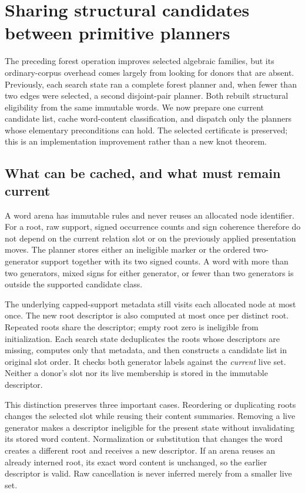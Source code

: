 \section{Sharing structural candidates between primitive planners}
\label{sec:primitive-planner}

The preceding forest operation improves selected algebraic families, but
its ordinary-corpus overhead comes largely from looking for donors that
are absent. Previously, each search state ran a complete forest planner
and, when fewer than two edges were selected, a second disjoint-pair
planner. Both rebuilt structural eligibility from the same immutable
words. We now prepare one current candidate list, cache word-content
classification, and dispatch only the planners whose elementary
preconditions can hold. The selected certificate is preserved; this is
an implementation improvement rather than a new knot theorem.

\subsection{What can be cached, and what must remain current}

A word arena has immutable rules and never reuses an allocated node identifier.
For a root, raw support, signed occurrence counts and sign coherence therefore
do not depend on the current relation slot or on the previously applied
presentation moves. The planner stores either an ineligible marker or the
ordered two-generator support together with its two signed counts. A word
with more than two generators, mixed signs for either generator, or fewer
than two generators is outside the supported candidate class.

The underlying capped-support metadata still visits each allocated node at
most once. The new root descriptor is also computed at most once per distinct
root. Repeated roots share the descriptor; empty root zero is ineligible
from initialization. Each search state deduplicates the roots whose descriptors
are missing, computes only that metadata, and then constructs a candidate
list in original slot order. It checks both generator labels against the
\emph{current} live set. Neither a donor's slot nor its live membership is
stored in the immutable descriptor.

This distinction preserves three important cases. Reordering or duplicating
roots changes the selected slot while reusing their content summaries.
Removing a live generator makes a descriptor ineligible for the present
state without invalidating its stored word content. Normalization or
substitution that changes the word creates a different root and receives
a new descriptor. If an arena reuses an already interned root, its exact word
content is unchanged, so the earlier descriptor is valid. Raw cancellation
is never inferred merely from a smaller live set.

